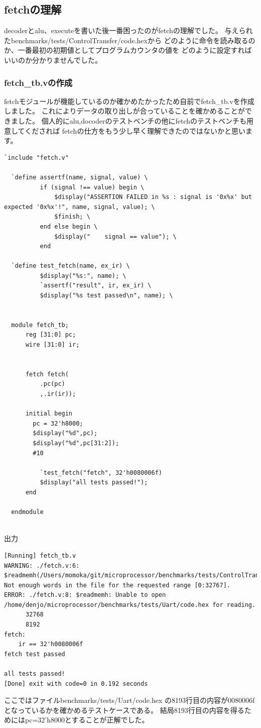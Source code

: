 \documentclass[a4paper,11pt]{jsarticle}
\begin{document}
\subsection{fetchの理解}
decoderとalu、executeを書いた後一番困ったのがfetchの理解でした。
与えられたbenchmarks/tests/ControlTransfer/code.hexから
どのように命令を読み取るのか、一番最初の初期値としてプログラムカウンタの値を
どのように設定すればいいのか分かりませんでした。
\subsubsection{fetch\_tb.vの作成}
fetchモジュールが機能しているのか確かめたかったため自前でfetch\_tb.vを作成しました。
これによりデータの取り出しが合っていることを確かめることができました。
個人的にalu,docoderのテストベンチの他にfetchのテストベンチも用意してくだされば
fetchの仕方をもう少し早く理解できたのではないかと思います。
\begin{lstlisting}[style={verilog-style}]
  `include "fetch.v"

  `define assertf(name, signal, value) \
          if (signal !== value) begin \
              $display("ASSERTION FAILED in %s : signal is '0x%x' but expected '0x%x'!", name, signal, value); \
              $finish; \
          end else begin \
              $display("    signal == value"); \
          end
  
  `define test_fetch(name, ex_ir) \
          $display("%s:", name); \
          `assertf("result", ir, ex_ir) \
          $display("%s test passed\n", name); \
  
  
  module fetch_tb;
      reg [31:0] pc;
      wire [31:0] ir;
  
  
      fetch fetch(
          .pc(pc)
          ,.ir(ir));
  
      initial begin
        pc = 32'h8000;
        $display("%d",pc);
        $display("%d",pc[31:2]);
        #10
  
          `test_fetch("fetch", 32'h0080006f)
          $display("all tests passed!");
      end
  
  endmodule
  
  \end{lstlisting}

  出力
  \begin{lstlisting}
[Running] fetch_tb.v
WARNING: ./fetch.v:6: $readmemh(/Users/momoka/git/microprocessor/benchmarks/tests/ControlTransfer/code.hex): Not enough words in the file for the requested range [0:32767].
ERROR: ./fetch.v:8: $readmemh: Unable to open /home/denjo/microprocessor/benchmarks/tests/Uart/code.hex for reading.
      32768
      8192
fetch:
    ir == 32'h0080006f
fetch test passed

all tests passed!
[Done] exit with code=0 in 0.192 seconds\end{lstlisting}
ここではファイルbenchmarks/tests/Uart/code.hex
の8193行目の内容が0080006fとなっているかを確かめるテストケースである。
結局8193行目の内容を得るためにはpc=32’h8000とすることが正解でした。
\end{document}
